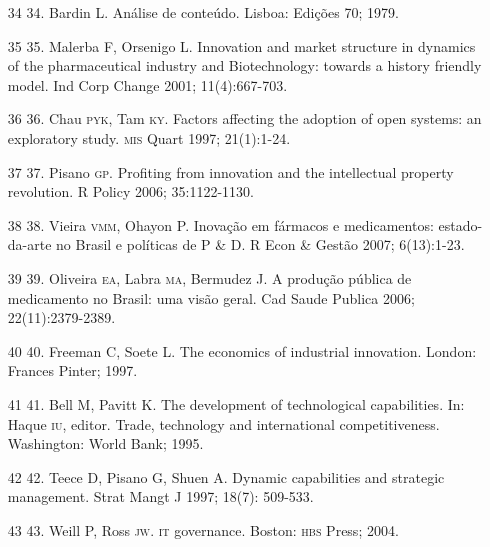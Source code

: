 \documentclass{article}
\begin{document}
\begin{itemize}
\item[34] 34. Bardin L. Análise de conteúdo. Lisboa: Edições 70; 1979.

\item[35] 35. Malerba F, Orsenigo L. Innovation and market structure in dynamics
of the pharmaceutical industry and Biotechnology: towards a history friendly
model. Ind Corp Change 2001; 11(4):667-703.

\item[36] 36. Chau \textsc{pyk}, Tam \textsc{ky}. Factors affecting the adoption of open systems:
an exploratory study. \textsc{mis} Quart 1997; 21(1):1-24.

\item[37] 37. Pisano \textsc{gp}. Profiting from innovation and the intellectual property
revolution. R Policy 2006; 35:1122-1130.

\item[38] 38. Vieira \textsc{vmm}, Ohayon P. Inovação em fármacos e medicamentos:
estado-da-arte no Brasil e políticas de P \& D. R Econ \& Gestão 2007;
6(13):1-23.

\item[39] 39. Oliveira \textsc{ea}, Labra \textsc{ma}, Bermudez J. A produção pública de
medicamento no Brasil: uma visão geral. Cad Saude Publica 2006;
22(11):2379-2389.

\item[40] 40. Freeman C, Soete L. The economics of industrial innovation.
London: Frances Pinter; 1997.

\item[41] 41. Bell M, Pavitt K. The development of technological capabilities.
In: Haque \textsc{iu}, editor. Trade, technology and international competitiveness.
Washington: World Bank; 1995.

\item[42] 42. Teece D, Pisano G, Shuen A. Dynamic capabilities and strategic
management. Strat Mangt J 1997; 18(7): 509-533.

\item[43] 43. Weill P, Ross \textsc{jw}. \textsc{it} governance. Boston: \textsc{hbs} Press; 2004.

\end{itemize}
\end{document}
